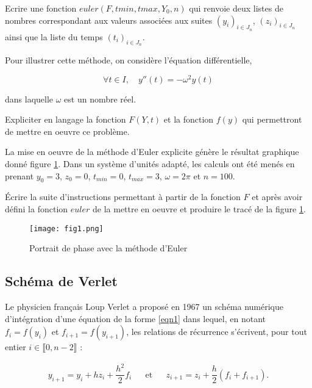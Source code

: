 \question{} Ecrire une fonction $euler(F, tmin, tmax, Y_0, n)$ qui renvoie deux listes de nombres correspondant aux valeurs associées aux suites $\left(y_i\right)_{i\in J_n}$, $\left(z_i\right)_{i\in J_n}$ ainsi que la liste du temps $\left(t_i\right)_{i\in J_n}$.

\bigskip{}

Pour illustrer cette méthode, on considère l'équation différentielle, 

\begin{equation}\label{eqn5}
\forall t\in I,\quad y''(t) = -\omega^2y(t)
\end{equation}

dans laquelle $\omega$ est un nombre réel.

\question{} Expliciter en langage \python{} la fonction $F(Y,t)$ et la fonction $f(y)$ qui permettront de mettre en oeuvre ce problème.

\bigskip

La mise en oeuvre de la méthode d'Euler explicite génère le résultat graphique donné figure \ref{fig1}. Dans
un système d'unités adapté, les calculs ont été menés en prenant $y_0 = 3$, $z_0 = 0$, $t_{min} = 0$, $t_{max} = 3$, $\omega = 2\pi$ et $n = 100$.

\question{} \'Ecrire la suite d'instructions permettant à partir de la fonction $F$ et après avoir défini la fonction $euler$ de la mettre en oeuvre et produire le tracé de la figure \ref{fig1}. 


\begin{figure}[!h]
\begin{center}
\texttt{[image: fig1.png]}
\caption{Portrait de phase avec la méthode d'Euler\label{fig1}}
\end{center}
\end{figure}


\subsection{Schéma de Verlet}


%

Le physicien français Loup Verlet a proposé en 1967 un schéma numérique d'intégration d'une équation de la forme \eqref{eqn1} dans lequel, en notant $f_i=f(y_i)$ et $f_{i+1}=f(y_{i+1})$, les relations de récurrence s'écrivent, pour tout entier $i\in \llbracket 0,n-2 \rrbracket$ : 

\begin{align}\label{eqn6}
\displaystyle
y_{i+1}=y_i+hz_i+\dfrac{h^2}{2}f_i && \textrm{et} && z_{i+1}=z_i+\dfrac{h}{2}\left(f_i+f_{i+1}\right).
\end{align}

